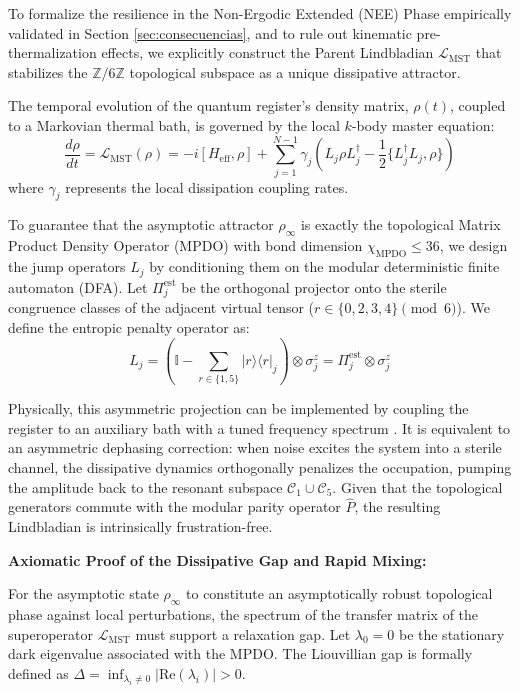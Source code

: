 \documentclass[12pt,a4paper]{article}
\theoremstyle{plain}
\theoremstyle{definition}
\theoremstyle{remark}
\begin{document}
To formalize the resilience in the Non-Ergodic Extended (NEE) Phase empirically validated in Section \ref{sec:consecuencias}, and to rule out kinematic pre-thermalization effects, we explicitly construct the Parent Lindbladian $\mathcal{L}_{\text{MST}}$ that stabilizes the $\mathbb{Z}/6\mathbb{Z}$ topological subspace as a unique dissipative attractor.

The temporal evolution of the quantum register's density matrix, $\rho(t)$, coupled to a Markovian thermal bath, is governed by the local $k$-body master equation:
\begin{equation}
\frac{d\rho}{dt} = \mathcal{L}_{\text{MST}}(\rho) = -i[H_{\text{eff}}, \rho] + \sum_{j=1}^{N-1} \gamma_j \left( L_j \rho L_j^\dagger - \frac{1}{2} \{ L_j^\dagger L_j, \rho \} \right)
\label{eq:app_lindblad_master}
\end{equation}
where $\gamma_j$ represents the local dissipation coupling rates.

To guarantee that the asymptotic attractor $\rho_\infty$ is exactly the topological Matrix Product Density Operator (MPDO) with bond dimension $\chi_{\text{MPDO}} \le 36$, we design the jump operators $L_j$ by conditioning them on the modular deterministic finite automaton (DFA). Let $\Pi_j^{\text{est}}$ be the orthogonal projector onto the sterile congruence classes of the adjacent virtual tensor ($r \in \{0,2,3,4\} \pmod 6$). We define the entropic penalty operator as:
\begin{equation}
L_j = \left( \mathbb{I} - \sum_{r \in \{1,5\}} |r\rangle\langle r|_j \right) \otimes \sigma_j^z = \Pi_j^{\text{est}} \otimes \sigma_j^z
\label{eq:app_jump_operators}
\end{equation}

Physically, this asymmetric projection can be implemented by coupling the register to an auxiliary bath with a tuned frequency spectrum \cite{Liu2025}. It is equivalent to an asymmetric dephasing correction: when noise excites the system into a sterile channel, the dissipative dynamics orthogonally penalizes the occupation, pumping the amplitude back to the resonant subspace $\mathcal{C}_1 \cup \mathcal{C}_5$. Given that the topological generators commute with the modular parity operator $\hat{P}$, the resulting Lindbladian is intrinsically frustration-free.

\textbf{Axiomatic Proof of the Dissipative Gap and Rapid Mixing:}

For the asymptotic state $\rho_\infty$ to constitute an asymptotically robust topological phase against local perturbations, the spectrum of the transfer matrix of the superoperator $\mathcal{L}_{\text{MST}}$ must support a relaxation gap. Let $\lambda_0 = 0$ be the stationary dark eigenvalue associated with the MPDO. The Liouvillian gap is formally defined as $\Delta = \inf_{\lambda_i \neq 0} |\text{Re}(\lambda_i)| > 0$.
\end{document}
